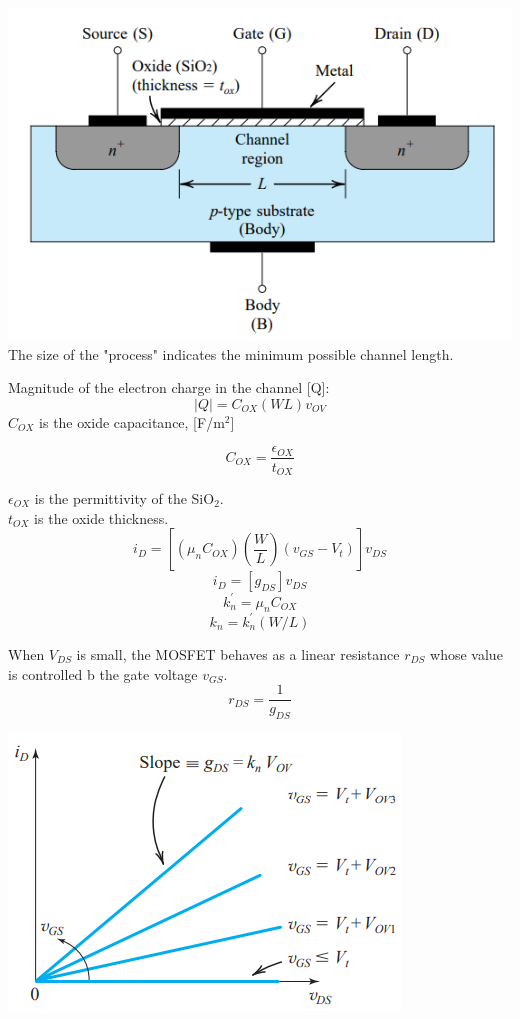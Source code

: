 \documentclass[a4paper]{article}
\begin{document}
\fontsize{6pt}{0pt}\selectfont
\setlength{\abovedisplayskip}{2pt}
\setlength{\belowdisplayskip}{0pt}

\begin{minipage}{5cm}
\includegraphics[width=\textwidth]{imgs/nmos}
The size of the "process" indicates the minimum
possible channel length. 

Magnitude of the electron charge in the channel [Q]:$$|Q|=C_{OX}(WL)v_{OV}$$
$C_{OX}$ is the oxide capacitance, [F/m$^2$]

$$C_{OX}=\frac{\epsilon_{OX}}{t_{OX}}$$

$\epsilon_{OX}$ is the permittivity of the SiO$_2$.\\
$t_{OX}$ is the oxide thickness.
$$i_D=\left[ (\mu_nC_{OX})\left(\frac{W}{L}\right)(v_{GS}-V_t)\right]v_{DS}$$
$$i_D=\left[ g_{DS} \right]v_{DS}$$
$$k_n^{'}=\mu_nC_{OX}$$
$$k_n=k_n^{'}(W/L)$$

When $V_{DS}$ is small, the MOSFET behaves as a linear 
resistance $r_{DS}$ whose value is controlled b the gate 
voltage $v_{GS}$.
$$r_{DS}=\frac{1}{g_{DS}}$$

\includegraphics[width=\textwidth]{imgs/nmos_as_r}


\end{minipage}
\end{document}
